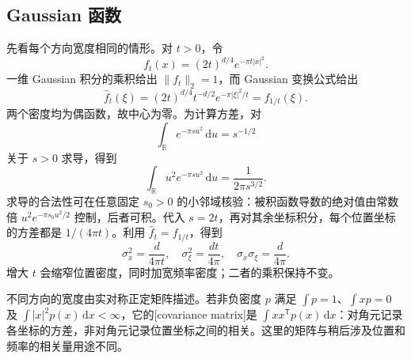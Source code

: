\subsection{Gaussian 函数}
\label{b2:subsec:200202}

先看每个方向宽度相同的情形。对 \(t>0\)，令
\[
 f_t(x)=(2t)^{d/4}e^{-\pi t|x|^2}.
\]
一维 Gaussian 积分的乘积给出 \(\|f_t\|_2=1\)，而 Gaussian 变换公式给出
\[
 \widehat f_t(\xi)
 =(2t)^{d/4}t^{-d/2}e^{-\pi|\xi|^2/t}
 =f_{1/t}(\xi).
\]
两个密度均为偶函数，故中心为零。为计算方差，对
\[
 \int_{\mathbb R}e^{-\pi s u^2}\,\mathrm du=s^{-1/2}
\]
关于 \(s>0\) 求导，得到
\[
 \int_{\mathbb R}u^2e^{-\pi s u^2}\,\mathrm du
 =\frac1{2\pi s^{3/2}}.
\]
求导的合法性可在任意固定 \(s_0>0\) 的小邻域核验：被积函数导数的绝对值由常数倍
\(u^2e^{-\pi s_0u^2/2}\) 控制，后者可积。代入 \(s=2t\)，再对其余坐标积分，每个位置坐标的方差都是 \(1/(4\pi t)\)。利用 \(\widehat f_t=f_{1/t}\)，得到
\[
 \sigma_x^2=\frac d{4\pi t},
 \quad
 \sigma_\xi^2=\frac{dt}{4\pi},
 \quad
 \sigma_x\sigma_\xi=\frac d{4\pi}.
\]
增大 \(t\) 会缩窄位置密度，同时加宽频率密度；二者的乘积保持不变。

不同方向的宽度由实对称正定矩阵描述。若非负密度 \(p\) 满足 \(\int p=1\)、\(\int xp=0\) 及 \(\int|x|^2p(x)\,\mathrm dx<\infty\)，它的[covariance matrix]是
\(\int xx^{\mathsf T}p(x)\,\mathrm dx\)：对角元记录各坐标的方差，非对角元记录位置坐标之间的相关。这里的矩阵与稍后涉及位置和频率的相关量用途不同。

